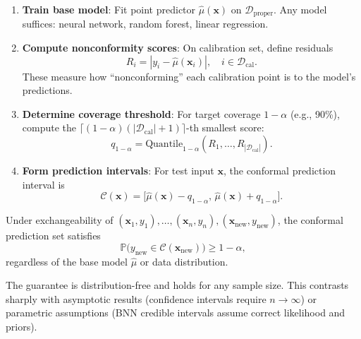\begin{enumerate}
    \item \textbf{Train base model}: Fit point predictor $\hat{\mu}(\mathbf{x})$ on $\mathcal{D}_{\text{proper}}$. Any model suffices: neural network, random forest, linear regression.

    \item \textbf{Compute nonconformity scores}: On calibration set, define residuals
    \begin{equation}
        R_i = |y_i - \hat{\mu}(\mathbf{x}_i)|, \quad i \in \mathcal{D}_{\text{cal}}.
    \end{equation}
    These measure how ``nonconforming'' each calibration point is to the model's predictions.

    \item \textbf{Determine coverage threshold}: For target coverage $1 - \alpha$ (e.g., 90\%), compute the $\lceil (1-\alpha)(|\mathcal{D}_{\text{cal}}| + 1) \rceil$-th smallest score:
    \begin{equation}
        q_{1-\alpha} = \text{Quantile}_{1-\alpha}(R_1, \ldots, R_{|\mathcal{D}_{\text{cal}}|}).
    \end{equation}

    \item \textbf{Form prediction intervals}: For test input $\mathbf{x}$, the conformal prediction interval is
    \begin{equation}\label{eq:conformal-interval}
        \mathcal{C}(\mathbf{x}) = \big[\hat{\mu}(\mathbf{x}) - q_{1-\alpha}, \, \hat{\mu}(\mathbf{x}) + q_{1-\alpha}\big].
    \end{equation}
\end{enumerate}

\begin{theorem}
Under exchangeability of $(\mathbf{x}_1, y_1), \ldots, (\mathbf{x}_n, y_n), (\mathbf{x}_{\text{new}}, y_{\text{new}})$, the conformal prediction set satisfies
\begin{equation}
    \mathbb{P}\big(y_{\text{new}} \in \mathcal{C}(\mathbf{x}_{\text{new}})\big) \geq 1 - \alpha,
\end{equation}
regardless of the base model $\hat{\mu}$ or data distribution.
\end{theorem}

The guarantee is distribution-free and holds for any sample size. This contrasts sharply with asymptotic results (confidence intervals require $n \to \infty$) or parametric assumptions (BNN credible intervals assume correct likelihood and priors).

